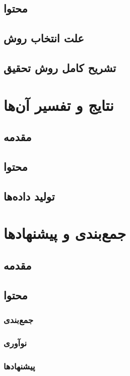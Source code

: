 \section{محتوا}
\section{علت انتخاب روش}
\section{تشریح کامل روش تحقیق}

\chapter{نتایج و تفسیر آن‌ها}
\section{مقدمه}
\section{محتوا}
\section{تولید داده‌ها}

\chapter{جمع‌بندی و پیشنهادها}
\section{مقدمه}
\section{محتوا}
\subsection{جمع‌بندی}
\subsection{نوآوری}
\subsection{پیشنهادها}

